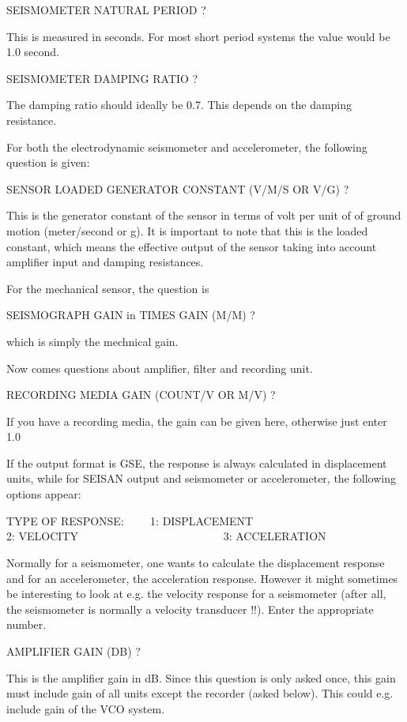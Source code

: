 SEISMOMETER NATURAL PERIOD ? 

This is measured in seconds. For most short period systems the value would be 1.0 second. 

SEISMOMETER DAMPING RATIO ? 

The damping ratio should ideally be 0.7. This depends on the damping resistance. 

For both the electrodynamic seismometer and accelerometer, the following question is given: 

SENSOR LOADED GENERATOR CONSTANT (V/M/S OR V/G) ? 

This is the generator constant of the sensor in terms of volt per unit of of ground motion (meter/second or g). It is important to note that this is the loaded constant, which means the effective output of the sensor taking into account amplifier input and damping resistances. 

For the mechanical sensor, the question is

 SEISMOGRAPH GAIN in TIMES GAIN (M/M) ?

which is simply the mechnical gain.

Now comes questions about amplifier, filter and recording unit. 

RECORDING MEDIA GAIN (COUNT/V OR M/V) ? 

If you have a recording media, the gain can be given here, otherwise just enter 1.0 

If the output format is GSE, the response is always calculated in displacement units, while for SEISAN output and seismometer or accelerometer, the following options appear: 

TYPE OF RESPONSE: \verb|    |1: DISPLACEMENT \newline
\verb|                         |2: VELOCITY \newline
\verb|                         |3: ACCELERATION 

Normally for a seismometer, one wants to calculate the displacement response and for an accelerometer, the acceleration response. However it might sometimes be interesting to look at e.g. 
the velocity response for a seismometer (after all, the seismometer is normally a velocity transducer !!). Enter the appropriate number. 

AMPLIFIER GAIN (DB) ? 

This is the amplifier gain in dB. Since this question is only asked once, this gain must include gain of all units except the recorder (asked below). This could e.g. include gain of the VCO system. 


